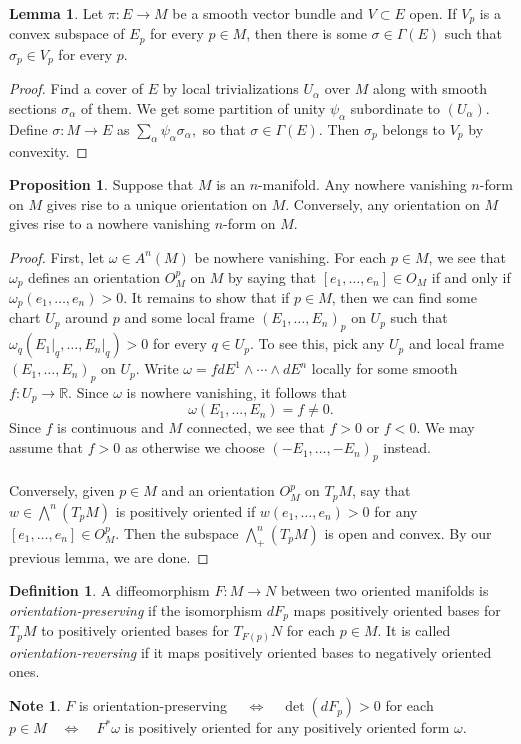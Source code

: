 \documentclass[10pt,letterpaper,cm]{nupset}
\theoremstyle{definition}
\newtheorem*{definition}{Definition}
\newtheorem{lemma}{Lemma}
\newtheorem*{note}{Note}
\newtheorem{prop}{Proposition}
\newcommand{\R}{\mathbb R}
\newcommand{\1}{\mathbf{1}}
\newcommand{\0}{\vec 0}
\begin{document}
\begin{lemma}
Let $\pi : E \to M$ be a smooth vector bundle and $V \subset E$ open. If $V_p$ is a convex subspace of $E_p$ for every $p\in M$, then there is some $\sigma \in \Gamma(E)$ such that $\sigma_p \in V_p$ for every $p$.
\end{lemma}
\begin{proof}
Find a cover of $E$ by local trivializations $U_{\alpha}$ over $M$ along with smooth sections $\sigma_{\alpha}$ of them. We get some partition of unity $\psi_{\alpha}$ subordinate to $(U_{\alpha})$. Define $\sigma: M \to E$ as $\sum_{\alpha} \psi_{\alpha}\sigma_{\alpha} ,$ so that $\sigma \in \Gamma(E)$. Then $\sigma_p$ belongs to $V_p$ by convexity.
\end{proof}

\begin{prop}
Suppose that $M$ is an $n$-manifold. Any nowhere vanishing $n$-form on $M$ gives rise to a unique orientation on $M$. Conversely, any orientation on $M$ gives rise to a nowhere vanishing $n$-form on $M$.
\end{prop}
\begin{proof}
First, let $\omega \in A^n(M)$ be nowhere vanishing. For each $p \in M$, we see that $\omega_p$ defines an orientation $O_M^p$ on $M$ by saying that $[e_1, \ldots, e_n] \in  O_M$ if and only if $\omega_p(e_1, \ldots, e_n) >0$. It remains to show that if $p\in M$, then we can find some chart $U_p$ around $p$ and some local frame $(E_1, \ldots, E_n)_p$ on $U_p$ such that $\omega_q(E_1\rvert_q, \ldots, E_n\rvert_q) >0$ for every $q \in U_p$. To see this, pick any $U_p$ and local frame $(E_1, \ldots, E_n)_p$ on $U_p$. Write $\omega = fdE^1 \wedge \cdots \wedge dE^n$ locally for some smooth $f: U_p \to \R$. Since $\omega$ is nowhere vanishing, it follows that $$\omega(E_1, \ldots, E_n) = f \ne 0.$$ Since $f$ is continuous and $M$ connected, we see that $f>0$ or $f<0$. We may assume that $f>0$ as otherwise we choose $(-E_1, \ldots, -E_n)_p$ instead. 
\\ \\
Conversely, given $p\in M$ and an orientation $O_M^p$ on $T_pM$, say that $w \in \bigwedge^n(T_pM)$ is positively oriented if $w(e_1, \ldots, e_n) >0$ for any $[e_1, \ldots, e_n] \in O_M^p$. Then the subspace $\bigwedge^n_+(T_pM)$ is open and convex. By our previous lemma, we are done.
\end{proof}

\begin{definition}
A diffeomorphism $F: M \to N$ between two oriented manifolds is \textit{orientation-preserving} if the isomorphism $dF_p$ maps positively oriented bases for $T_pM$ to positively oriented bases for $T_{F(p)}N$ for each $p\in M$. It is called \textit{orientation-reversing} if it maps positively oriented bases to negatively oriented ones.
\end{definition}
\begin{note}
$F$ is orientation-preserving $\quad \iff \quad  \det(dF_p) >0$ for each $p \in M \quad \iff \quad F^{\ast}\omega$ is positively oriented for any positively oriented form $\omega$.
\end{note}
\end{document}
